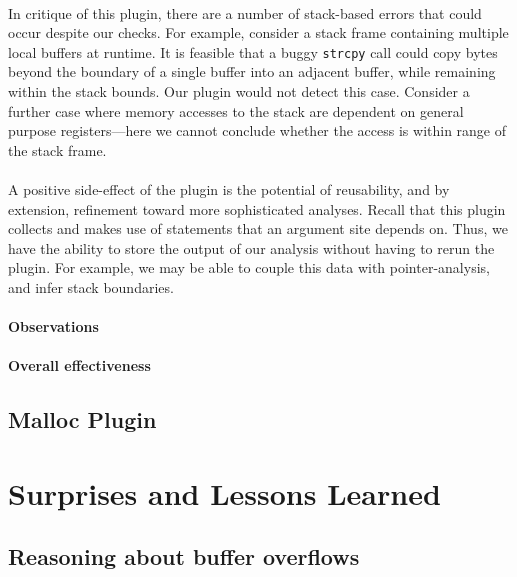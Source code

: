 \documentclass[letterpaper,11pt]{article}
\begin{document}
\paragraph{}
In critique of this plugin, there are a number of stack-based errors that could
occur despite our checks. For example, consider a stack frame containing
multiple local buffers at runtime. It is feasible that a buggy \texttt{strcpy}
call could copy bytes beyond the boundary of a single buffer into an adjacent
buffer, while remaining within the stack bounds. Our plugin would not detect
this case. Consider a further case where memory accesses to the stack 
are dependent on general purpose registers---here we cannot conclude
whether the access is within range of the stack frame.

\paragraph{}
A positive side-effect of the plugin is the potential of reusability, and by
extension, refinement toward more sophisticated analyses. Recall that this
plugin collects and makes use of statements that an argument site depends on.
Thus, we have the ability to store the output of our analysis without having to
rerun the plugin. For example, we may be able to couple this data with
pointer-analysis, and infer stack boundaries.


\paragraph{Observations}

\paragraph{Overall effectiveness}


\subsection{Malloc Plugin}


\section{Surprises and Lessons Learned}
\label{lessonslearned}

\subsection{Reasoning about buffer overflows}
\end{document}
